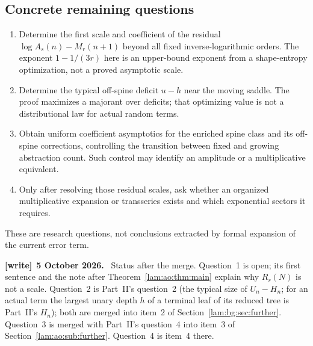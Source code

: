 \documentclass[11pt,a4paper]{article}
\numberwithin{equation}{section}
\theoremstyle{remark}
\newenvironment{writenote}[1][]{\par\smallskip\begingroup\small
 \noindent\textbf{[write]}\if\relax\detokenize{#1}\relax\else~\textbf{#1.}\fi\ }%
 {\par\endgroup\smallskip}
\begin{document}
\subsection{Concrete remaining questions}
\begin{enumerate}
\item Determine the first scale and coefficient of the residual $\log A_s(n)-M_r(n+1)$ beyond all fixed inverse-logarithmic orders. The exponent $1-1/(3r)$ here is an upper-bound exponent from a shape-entropy optimization, not a proved asymptotic scale.
\item Determine the typical off-spine deficit $u-h$ near the moving saddle. The proof maximizes a majorant over deficits; that optimizing value is not a distributional law for actual random terms.
\item Obtain uniform coefficient asymptotics for the enriched spine class and its off-spine corrections, controlling the transition between fixed and growing abstraction count. Such control may identify an amplitude or a multiplicative equivalent.
\item Only after resolving those residual scales, ask whether an organized multiplicative expansion or transseries exists and which exponential sectors it requires.
\end{enumerate}
These are research questions, not conclusions extracted by formal expansion of the current error term.

\begin{writenote}[5 October 2026]
Status after the merge. Question~1 is open; its first sentence and the note after Theorem~\ref{lam:ao:thm:main} explain why $R_r(N)$ is not a scale. Question~2 is Part~II's question~2 (the typical size of $U_n-H_n$; for an actual term the largest unary depth $h$ of a terminal leaf of its reduced tree is Part~II's $H_n$); both are merged into item~2 of Section~\ref{lam:bg:sec:further}. Question~3 is merged with Part~II's question~4 into item~3 of Section~\ref{lam:ao:sub:further}. Question~4 is item~4 there.
\end{writenote}
\end{document}
